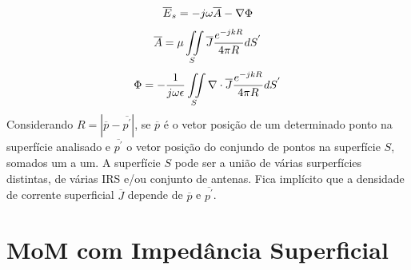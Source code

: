\documentclass[
	12pt,				%
	openright,			%
	oneside,			%
	a4paper,			%
	english,			%
	brazil				%
	]{abntex2}
\begin{document}
\begin{equation}{\label{CampoEspalhado}}
  \overline{E}_{s}=-j\omega \overline{A} - \nabla \Phi
\end{equation}
\begin{equation}{\label{VetorPotencialMagnetico}}
  \overline{A} =\mu \iint\limits_S\overline{J} \frac{e^{-j k R}}{4 \pi R} dS^{'}
  \end{equation}
\begin{equation}{\label{PotencialEscalar}}
  \Phi =-\frac{1}{j\omega \epsilon}\iint\limits_S \nabla \cdot \overline{J}\frac{e^{-j k R}}{4 \pi R} dS^{'}
  \end{equation}
Considerando $R=|\overline{p}-\overline{p^{'}}|$,  se $\overline{p}$ é o vetor posição de um determinado ponto na superfície  analisado e $\overline{p^{'}}$ o vetor posição do conjundo de pontos na superfície $S$, somados um a um. A superfície $S$ pode ser a união de várias surperfícies distintas, de várias IRS e/ou conjunto de antenas. Fica implícito que a densidade de corrente superficial $\overline{J}$ depende de $\overline{p}$ e $\overline{p^{'}}$. 

\section{MoM com Impedância Superficial}
\end{document}
